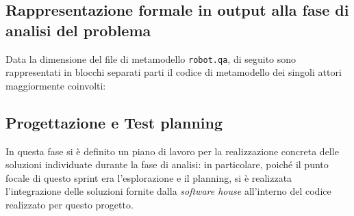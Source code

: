 \newpage

\subsection[Rappresentazione formale]{Rappresentazione formale in output alla fase di analisi del problema}

Data la dimensione del file di metamodello \texttt{robot.qa}, di seguito sono rappresentati in blocchi separati parti il codice di metamodello dei singoli attori maggiormente coinvolti:

% 
% 

% 



% 


% 


% 
% 

% 
% 

% 
% 

\subsection{Progettazione e Test planning}

In questa fase si è definito un piano di lavoro per la realizzazione concreta delle soluzioni individuate durante la fase di analisi:
in particolare, poiché il punto focale di questo sprint era l'esplorazione e il planning, si è realizzata l'integrazione delle soluzioni fornite dalla \textit{software house} all'interno del codice realizzato per questo progetto.

